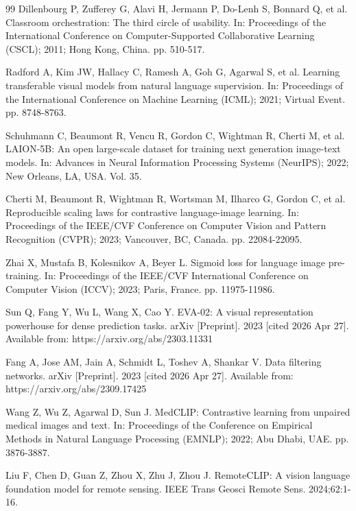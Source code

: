 \documentclass{ieeeaccess}
\begin{document}
\begin{thebibliography}{99}
Dillenbourg P, Zufferey G, Alavi H, Jermann P, Do-Lenh S, Bonnard Q,
et al.
Classroom orchestration: The third circle of usability.
In: Proceedings of the International Conference on
Computer-Supported Collaborative Learning (CSCL); 2011; Hong Kong,
China. pp. 510-517.

Radford A, Kim JW, Hallacy C, Ramesh A, Goh G, Agarwal S, et al.
Learning transferable visual models from natural language supervision.
In: Proceedings of the International Conference on Machine Learning
(ICML); 2021; Virtual Event. pp. 8748-8763.

Schuhmann C, Beaumont R, Vencu R, Gordon C, Wightman R, Cherti M,
et al. LAION-5B: An open large-scale dataset for training next
generation image-text models. In: Advances in Neural Information
Processing Systems (NeurIPS); 2022; New Orleans, LA, USA. Vol. 35.

Cherti M, Beaumont R, Wightman R, Wortsman M, Ilharco G, Gordon C,
et al.
Reproducible scaling laws for contrastive language-image learning.
In: Proceedings of the IEEE/CVF Conference on Computer Vision and
Pattern Recognition (CVPR); 2023; Vancouver, BC, Canada.
pp. 22084-22095.

Zhai X, Mustafa B, Kolesnikov A, Beyer L.
Sigmoid loss for language image pre-training.
In: Proceedings of the IEEE/CVF International Conference on Computer
Vision (ICCV); 2023; Paris, France. pp. 11975-11986.

Sun Q, Fang Y, Wu L, Wang X, Cao Y.
EVA-02: A visual representation powerhouse for dense prediction tasks.
arXiv [Preprint]. 2023 [cited 2026 Apr 27]. Available from:
https://arxiv.org/abs/2303.11331

Fang A, Jose AM, Jain A, Schmidt L, Toshev A, Shankar V.
Data filtering networks.
arXiv [Preprint]. 2023 [cited 2026 Apr 27]. Available from:
https://arxiv.org/abs/2309.17425

Wang Z, Wu Z, Agarwal D, Sun J.
MedCLIP: Contrastive learning from unpaired medical images and text.
In: Proceedings of the Conference on Empirical Methods in Natural
Language Processing (EMNLP); 2022; Abu Dhabi, UAE. pp. 3876-3887.

Liu F, Chen D, Guan Z, Zhou X, Zhu J, Zhou J.
RemoteCLIP: A vision language foundation model for remote sensing.
IEEE Trans Geosci Remote Sens. 2024;62:1-16.


\end{thebibliography}
\end{document}
